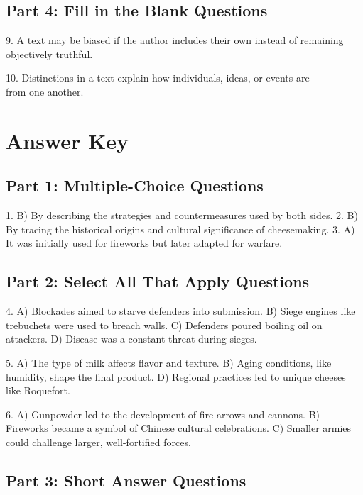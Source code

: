 \documentclass[12pt]{article}
\begin{document}
\subsection*{Part 4: Fill in the Blank Questions}
\vspace{1cm}
9. A text may be biased if the author includes their own \underline{\hspace{4cm}} instead of remaining objectively truthful.  
\vspace{2cm}

10. Distinctions in a text explain how individuals, ideas, or events are\\ \underline{\hspace{4cm}} from one another.  
\vspace{2cm}
\newpage
\section*{Answer Key}

\subsection*{Part 1: Multiple-Choice Questions}

1. B) By describing the strategies and countermeasures used by both sides.  
2. B) By tracing the historical origins and cultural significance of cheesemaking.  
3. A) It was initially used for fireworks but later adapted for warfare.

\subsection*{Part 2: Select All That Apply Questions}

4. A) Blockades aimed to starve defenders into submission.  
   B) Siege engines like trebuchets were used to breach walls.  
   C) Defenders poured boiling oil on attackers.  
   D) Disease was a constant threat during sieges.  

5. A) The type of milk affects flavor and texture.  
   B) Aging conditions, like humidity, shape the final product.  
   D) Regional practices led to unique cheeses like Roquefort.

6. A) Gunpowder led to the development of fire arrows and cannons.  
   B) Fireworks became a symbol of Chinese cultural celebrations.  
   C) Smaller armies could challenge larger, well-fortified forces.

\subsection*{Part 3: Short Answer Questions}
\end{document}
